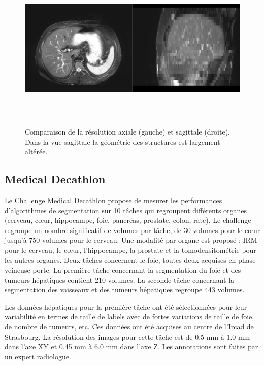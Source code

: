 \begin{figure}
    \centering
    \includegraphics[height=8cm]{Images/CHAOS_resolution.png}
    \caption{Comparaison de la résolution axiale (gauche) et sagittale (droite). Dans la vue sagittale la géométrie des structures est largement altérée.}
    \label{fig:CHAOS_geometry}
\end{figure}

\subsection{Medical Decathlon}

Le Challenge Medical Decathlon propose de mesurer les performances d'algorithmes de segmentation sur 10 tâches qui regroupent différents organes (cerveau, cœur, hippocampe, foie, pancréas, prostate, colon, rate). Le challenge regroupe un nombre significatif de volumes par tâche, de 30 volumes pour le cœur jusqu'à 750 volumes pour le cerveau. Une modalité par organe est proposé : IRM pour le cerveau, le cœur, l'hippocampe, la prostate et la tomodensitométrie pour les autres organes. Deux tâches concernent le foie, toutes deux acquises en phase veineuse porte. La première tâche concernant la segmentation du foie et des tumeurs hépatiques contient 210 volumes. La seconde tâche concernant la segmentation des vaisseaux et des tumeurs hépatiques regroupe 443 volumes.

Les données hépatiques pour la première tâche ont été sélectionnées pour leur variabilité en termes de taille de labels avec de fortes variations de taille de foie, de nombre de tumeurs, etc. Ces données ont été acquises au centre de l'Ircad de Strasbourg. La résolution des images pour cette tâche est de 0.5 mm à 1.0 mm dans l'axe XY et 0.45 mm à 6.0 mm dans l'axe Z. Les annotations sont faites par un expert radiologue.

